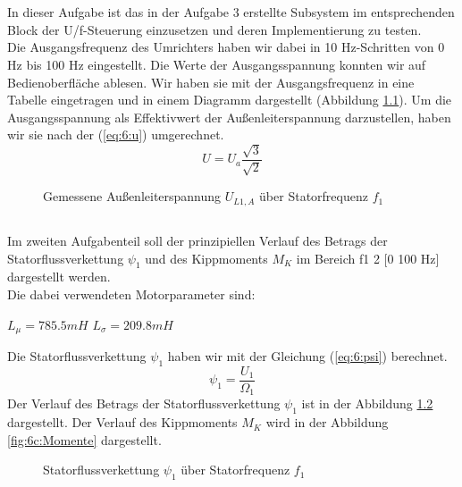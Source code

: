 \chapter{}

\section{}
In dieser Aufgabe ist das in der Aufgabe 3 erstellte Subsystem im entsprechenden Block der U/f-Steuerung einzusetzen und deren Implementierung zu testen.\\
Die Ausgangsfrequenz des Umrichters haben wir dabei in 10 Hz-Schritten von 0 Hz bis 100 Hz eingestellt. Die Werte der Ausgangsspannung konnten wir auf Bedienoberfläche ablesen. Wir haben sie mit der Ausgangsfrequenz in eine Tabelle eingetragen und in einem Diagramm dargestellt (Abbildung \ref{fig:6b:UL}). Um die Ausgangsspannung als Effektivwert der Außenleiterspannung darzustellen, haben wir sie nach der (\ref{eq:6:u}) umgerechnet.
\begin{equation}
	U = U_{a}\frac{\sqrt{3}}{\sqrt{2}}
	\label{eq:6:u}
\end{equation}
\begin{figure}[h]
	\centering
	
	\caption{Gemessene Außenleiterspannung $ U_{L1,A}  $ über Statorfrequenz $ f_{1} $}
	\label{fig:6b:UL}
\end{figure}



\section{}
Im zweiten Aufgabenteil soll der prinzipiellen Verlauf des Betrags der Statorflussverkettung $ \psi_{1} $ und des Kippmoments $ M_{K} $ im Bereich f1 2 [0 100 Hz] dargestellt werden.\\
Die dabei verwendeten Motorparameter sind:
\begin{center}
	$ L_{\mu} = 785.5mH $ \hspace{2cm} $ L_{\sigma} = 209.8mH $
\end{center}
Die Statorflussverkettung $ \psi_{1} $ haben wir mit der Gleichung (\ref{eq:6:psi}) berechnet.
\begin{equation}
	\psi_{1} = \frac{U_{1}}{\Omega_{1}}
	\label{eq:6:psi}
\end{equation}
Der Verlauf des Betrags der Statorflussverkettung $ \psi_{1} $ ist in der Abbildung \ref{fig:6b:psi} dargestellt. Der Verlauf des Kippmoments $ M_{K} $ wird in der Abbildung \ref{fig:6c:Momente} dargestellt.
\begin{figure}[h]
	\centering
	
	\caption{Statorflussverkettung $ \psi_{1} $ über Statorfrequenz $ f_{1} $}
	\label{fig:6b:psi}
\end{figure}



